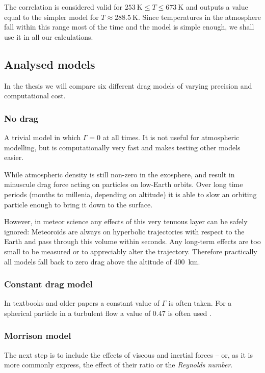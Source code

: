             The correlation is considered valid for $\SI{253}{\kelvin} \leq T \leq \SI{673}{\kelvin}$
            and outputs a value equal to the simpler model for $T \approx \SI{288.5}{\kelvin}$.
            Since temperatures in the atmosphere fall within this range most of the time
            and the model is simple enough, we shall use it in all our calculations.

    \subsection{Analysed models} \label{fdm}
        In the thesis we will compare six different drag models of varying precision
        and computational cost.

        \subsubsection{No drag} \label{fdmn}
            A trivial model in which $\Gamma = 0$ at all times.
            It is not useful for atmospheric modelling, but is computationally
            very fast and makes testing other models easier.

            While atmospheric density is still non-zero in the exosphere,
            and result in minuscule drag force acting on particles on low-Earth orbits.
            Over long time periods (months to millenia, depending on altitude) it is able to slow
            an orbiting particle enough to bring it down to the surface.

            However, in meteor science any effects of this very tenuous layer can be safely ignored:
            Meteoroids are always on hyperbolic trajectories with respect to the Earth
            and pass through this volume within seconds. Any long-term effects
            are too small to be measured or to appreciably alter the trajectory.
            Therefore practically all models fall back to zero drag above the altitude of \SI{400}{\kilo\metre}.

        \subsubsection{Constant drag model} \label{fdmc}
            In textbooks and older papers a constant value of $\Gamma$ is often taken.
            For a spherical particle in a turbulent flow a value of \num{0.47}
            is often used \cite{???}. \cite{hrábek} \cite{havrila}

        \subsubsection{Morrison model} \label{fdmM}
            The next step is to include the effects of viscous and inertial forces -- or,
            as it is more commonly express, the effect of their ratio or the \emph{Reynolds number}.

